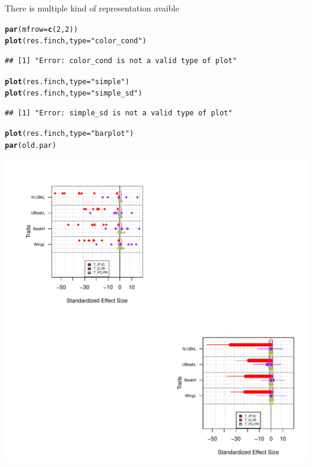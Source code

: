 \documentclass[12pt]{article}\usepackage[]{graphicx}\usepackage[]{color}
\makeatletter
\def\maxwidth{ %
  \ifdim\Gin@nat@width>\linewidth
    \linewidth
  \else
    \Gin@nat@width
  \fi
}
\newcommand{\hlnum}[1]{\textcolor[rgb]{0.686,0.059,0.569}{#1}}%
\newcommand{\hlstr}[1]{\textcolor[rgb]{0.192,0.494,0.8}{#1}}%
\newcommand{\hlstd}[1]{\textcolor[rgb]{0.345,0.345,0.345}{#1}}%
\newcommand{\hlkwc}[1]{\textcolor[rgb]{0.333,0.667,0.333}{#1}}%
\newcommand{\hlkwd}[1]{\textcolor[rgb]{0.737,0.353,0.396}{\textbf{#1}}}%
\newenvironment{kframe}{%
 \def\at@end@of@kframe{}%
 \ifinner\ifhmode%
  \def\at@end@of@kframe{\end{minipage}}%
  \begin{minipage}{\columnwidth}%
 \fi\fi%
 \def\FrameCommand##1{\hskip\@totalleftmargin \hskip-\fboxsep
 \colorbox{shadecolor}{##1}\hskip-\fboxsep
     \hskip-\linewidth \hskip-\@totalleftmargin \hskip\columnwidth}%
 \MakeFramed {\advance\hsize-\width
   \@totalleftmargin\z@ \linewidth\hsize
   \@setminipage}}%
 {\par\unskip\endMakeFramed%
 \at@end@of@kframe}
\newenvironment{knitrout}{}{} %
\makeatother
\begin{document}
There is multiple kind of representation avaible
\begin{knitrout}
\color{fgcolor}\begin{kframe}
\begin{alltt}
\hlkwd{par}\hlstd{(}\hlkwc{mfrow}\hlstd{=}\hlkwd{c}\hlstd{(}\hlnum{2}\hlstd{,}\hlnum{2}\hlstd{))}
\hlkwd{plot}\hlstd{(res.finch,} \hlkwc{type}\hlstd{=}\hlstr{"color_cond"}\hlstd{)}
\end{alltt}
\begin{verbatim}
## [1] "Error: color_cond is not a valid type of plot"
\end{verbatim}
\begin{alltt}
\hlkwd{plot}\hlstd{(res.finch,} \hlkwc{type}\hlstd{=}\hlstr{"simple"}\hlstd{)}
\hlkwd{plot}\hlstd{(res.finch,} \hlkwc{type}\hlstd{=}\hlstr{"simple_sd"}\hlstd{)}
\end{alltt}
\begin{verbatim}
## [1] "Error: simple_sd is not a valid type of plot"
\end{verbatim}
\begin{alltt}
\hlkwd{plot}\hlstd{(res.finch,} \hlkwc{type}\hlstd{=}\hlstr{"barplot"}\hlstd{)}
\hlkwd{par}\hlstd{(old.par)}
\end{alltt}
\end{kframe}

{\centering \includegraphics[width=\maxwidth]{figure/unnamed-chunk-30} 

}



\end{knitrout}
\end{document}

